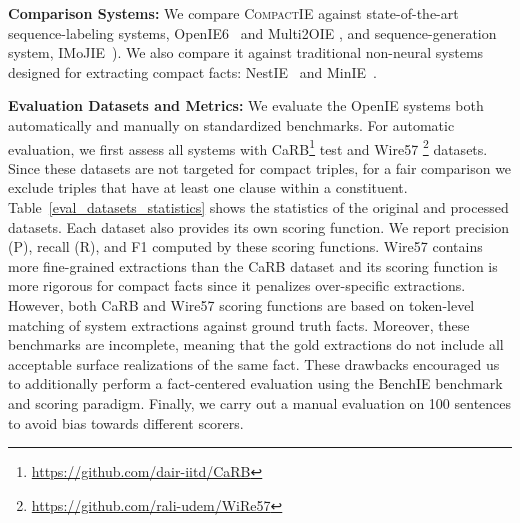 \documentclass[11pt,a4paper]{article}
\newcommand{\system}{{\textsc{CompactIE}}}
\begin{document}
\noindent
{\bf Comparison Systems:} We compare \system{} against state-of-the-art sequence-labeling systems, OpenIE6~\cite{openie6} and Multi2OIE \cite{multi2OIE}, and sequence-generation system, IMoJIE~\cite{imojie}). We also compare it against traditional non-neural systems designed for extracting compact facts: NestIE~\cite{nestie} and MinIE~\cite{minie}.

\begin{table}
\begin{center}
\end{center}
\caption{\label{eval_datasets_statistics} Statistics of evaluation datasets, Wire57 and CaRB, before (Orig) and after processing (Proc). }
\end{table}

\noindent
{\bf Evaluation Datasets and Metrics:} 
{We evaluate the OpenIE systems both automatically and manually on standardized benchmarks. For automatic evaluation, we first assess all systems with CaRB\footnote{\url{https://github.com/dair-iitd/CaRB}} test and Wire57 \footnote{\url{https://github.com/rali-udem/WiRe57}} datasets. Since these datasets are not targeted for compact triples, for a fair comparison we exclude triples that have at least one clause within a constituent.  
Table~\ref{eval_datasets_statistics} shows the statistics of the original and processed datasets. Each dataset also provides its own scoring function. We report precision (P), recall (R), and F1 computed by these scoring functions. Wire57 contains more fine-grained extractions than the CaRB dataset and its scoring function is more rigorous for compact facts since it penalizes over-specific extractions. However, both CaRB and Wire57 scoring functions are based on token-level matching of system extractions against ground truth facts. Moreover, these benchmarks are incomplete, meaning that the gold extractions do not include all acceptable surface realizations of the same fact. These drawbacks encouraged us to additionally perform a fact-centered evaluation using the BenchIE \cite{benchIE} benchmark and scoring paradigm. Finally, we carry out a manual evaluation on 100 sentences to avoid bias towards different scorers.}
\end{document}
